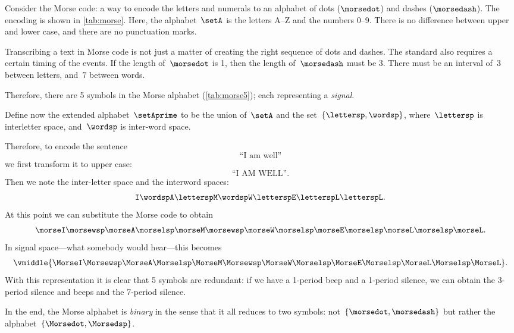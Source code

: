 \begin{example}
	\label{exa:morse-code}
	Consider the Morse code: a way to encode the letters and numerals to an alphabet of dots ($\morsedot$) and dashes ($\morsedash$).
	The encoding is shown in \cref{tab:morse}.
	Here, the alphabet~$\setA$ is the letters A--Z and the numbers 0--9.
	There is no difference between upper and lower case, and there are no punctuation marks.

	Transcribing a text in Morse code is not just a matter of creating the right sequence of dots and dashes.
	The standard also requires a certain timing of the events.
	If the length of~$\morsedot$ is 1, then the length of~$\morsedash$ must be 3.
	There must be an interval of~$3$ between letters, and~$7$ between words.

	Therefore, there are 5 symbols in the Morse alphabet (\cref{tab:morse5}); each representing a \emph{signal}.

	Define now the extended alphabet~$\setAprime$ to be the union of~$\setA$ and the set~$\{\lettersp, \wordsp\}$, where~$\lettersp$ is interletter space, and~$\wordsp$ is inter-word space.

	Therefore, to encode the sentence
	\begin{equation*}
		\text{``I am well''}
	\end{equation*}
	we first transform it to upper case:
	\begin{equation*}
		\text{``I AM WELL''}.
	\end{equation*}
	Then we note the inter-letter space and the interword spaces:
	\begin{equation*}
		\texttt{I} \wordsp \texttt{A} \lettersp \texttt{M} \wordsp \texttt{W} \lettersp
		\texttt{E} \lettersp \texttt{L} \lettersp \texttt{L}.
	\end{equation*}
	At this point we can substitute the Morse code to obtain
	\begin{equation*}
		\morseI \morsewsp \morseA \morselsp \morseM \morsewsp \morseW \morselsp \morseE \morselsp \morseL \morselsp \morseL.
	\end{equation*}
	In signal space---what somebody would hear---this becomes
	\begin{equation*}
		\vmiddle{\MorseI \Morsewsp \MorseA \Morselsp \MorseM \Morsewsp \MorseW \Morselsp \MorseE \Morselsp \MorseL \Morselsp \MorseL}.
	\end{equation*}
	With this representation it is clear that 5 symbols are redundant: if we have a 1-period beep and a 1-period silence, we can obtain the 3-period silence and beeps and the 7-period silence.

	In the end, the Morse alphabet is \emph{binary} in the sense that it all reduces to two symbols: not~$\{\morsedot, \morsedash\}$ but rather the alphabet~$\{\Morsedot, \Morsedsp\}$.
\end{example}

